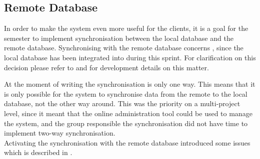 \subsection{Remote Database}\label{sec:developments:remotedb}
In order to make the \giraf system even more useful for the clients, it is a goal for the semester to implement synchronisation between the local database and the remote database.
Synchronising with the remote database concerns \launcher, since the local database has been integrated into \launcher during this sprint.
For clarification on this decision please refer to  and  for development details on this matter.

At the moment of writing the synchronisation is only one way. 
This means that it is only possible for the system to synchronise data from the remote to the local database, not the other way around. 
This was the priority on a multi-project level, since it meant that the online administration tool could be used to manage the system, and the group responsible the synchronisation did not have time to implement two-way synchronisation.\\

Activating the synchronisation with the remote database introduced some issues which is described in .